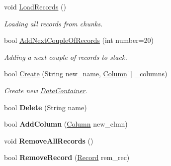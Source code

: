 \begin{DoxyCompactItemize}
\item 
void \hyperlink{class_dwarf_d_b_1_1_data_structures_1_1_data_container_aa5a712b9a8923f2d57278b58d46d6927}{LoadRecords} ()
\begin{DoxyCompactList}\small\item\em Loading all records from chunks. \item\end{DoxyCompactList}\item 
bool \hyperlink{class_dwarf_d_b_1_1_data_structures_1_1_data_container_ac2f044ee93ae6a4ba25b0deb9333867e}{AddNextCoupleOfRecords} (int number=20)
\begin{DoxyCompactList}\small\item\em Adding a next couple of records to stack. \item\end{DoxyCompactList}\item 
bool \hyperlink{class_dwarf_d_b_1_1_data_structures_1_1_data_container_accdc07066ac67d50fe891f8768e734b9}{Create} (String new\_\-name, \hyperlink{class_dwarf_d_b_1_1_data_structures_1_1_column}{Column}\mbox{[}$\,$\mbox{]} \_\-columns)
\begin{DoxyCompactList}\small\item\em Create new \hyperlink{class_dwarf_d_b_1_1_data_structures_1_1_data_container}{DataContainer}. \item\end{DoxyCompactList}\item 
\hypertarget{class_dwarf_d_b_1_1_data_structures_1_1_data_container_acee585ee5f3d45fe8474a03d533e9119}{
bool {\bfseries Delete} (String name)}
\label{class_dwarf_d_b_1_1_data_structures_1_1_data_container_acee585ee5f3d45fe8474a03d533e9119}

\item 
\hypertarget{class_dwarf_d_b_1_1_data_structures_1_1_data_container_a8e38284dde8d76439d691723da7f80fb}{
bool {\bfseries AddColumn} (\hyperlink{class_dwarf_d_b_1_1_data_structures_1_1_column}{Column} new\_\-clmn)}
\label{class_dwarf_d_b_1_1_data_structures_1_1_data_container_a8e38284dde8d76439d691723da7f80fb}

\item 
\hypertarget{class_dwarf_d_b_1_1_data_structures_1_1_data_container_a1430289cc6995618a055ff537c7c0d4e}{
void {\bfseries RemoveAllRecords} ()}
\label{class_dwarf_d_b_1_1_data_structures_1_1_data_container_a1430289cc6995618a055ff537c7c0d4e}

\item 
\hypertarget{class_dwarf_d_b_1_1_data_structures_1_1_data_container_ae5974df1699b7ccb5e6a41b0d86aeb85}{
bool {\bfseries RemoveRecord} (\hyperlink{class_dwarf_d_b_1_1_data_structures_1_1_record}{Record} rem\_\-rec)}
\label{class_dwarf_d_b_1_1_data_structures_1_1_data_container_ae5974df1699b7ccb5e6a41b0d86aeb85}


\end{DoxyCompactItemize}
